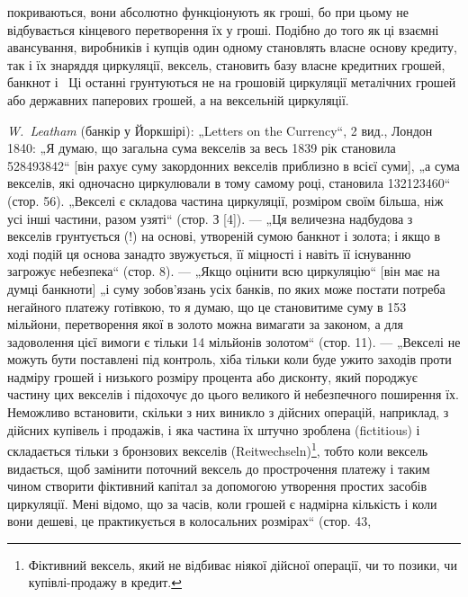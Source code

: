 \parcont{}  %
покриваються, вони абсолютно функціонують як гроші, бо при
цьому не відбувається кінцевого перетворення їх у гроші. Подібно
до того як ці взаємні авансування, виробників і купців
один одному становлять власне основу кредиту, так і їх знаряддя
циркуляції, вексель, становить базу власне кредитних
грошей, банкнот і~ Ці останні грунтуються не на грошовій
циркуляції металічних грошей або державних паперових грошей,
а на вексельній циркуляції.

\begin{small}
\noindent{}\emph{W.~Leatham} (банкір у Йоркшірі): „Letters on the Currency“, 2 вид., Лондон 1840:
„Я думаю, що загальна сума векселів за весь 1839 рік становила \num{528493842}“ [він рахує суму закордонних векселів приблизно в  всієї суми],
„а сума векселів, які одночасно циркулювали в тому самому році, становила
\num{132123460}“ (стор. 56). „Векселі є складова частина циркуляції,
розміром своїм більша, ніж усі інші частини, разом узяті“ (стор. З [4]). — „Ця
величезна надбудова з векселів грунтується (!) на основі, утвореній сумою
банкнот і золота; і якщо в ході подій ця основа занадто звужується, її міцності
і навіть її існуванню загрожує небезпека“ (стор. 8). — „Якщо оцінити всю
циркуляцію“ [він має на думці банкноти] „і суму зобов’язань усіх банків,
по яких може постати потреба негайного платежу готівкою, то я думаю, що
це становитиме суму в 153 мільйони, перетворення якої в золото можна вимагати
за законом, а для задоволення цієї вимоги є тільки 14 мільйонів золотом“
(стор. 11). — „Векселі не можуть бути поставлені під контроль, хіба тільки
коли буде ужито заходів проти надміру грошей і низького розміру процента
або дисконту, який породжує частину цих векселів і підохочує до цього великого
й небезпечного поширення їх. Неможливо встановити, скільки з них виникло
з дійсних операцій, наприклад, з дійсних купівель і продажів, і яка частина їх
штучно зроблена (fictitious) і складається тільки з бронзових векселів (Reitwechseln)\footnote*{
Фіктивний вексель, який не відбиває ніякої дійсної операції, чи то позики,
чи купівлі-продажу в кредит. 
}, тобто коли
вексель видається, щоб замінити поточний вексель до прострочення платежу і таким чином створити
фіктивний капітал за допомогою утворення простих засобів циркуляції. Мені відомо, що за часів, коли
грошей є надмірна кількість і коли вони дешеві, це практикується в колосальних розмірах“ (стор. 43,

\end{small}
